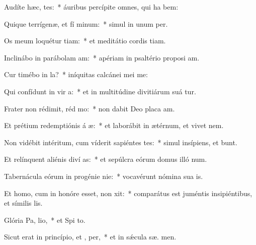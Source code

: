 \item Audíte hæc,  tes:~* áuribus percípite omnes, qui ha bem:
\item Quique terrígenæ, et fí minum:~* simul in unum   per.
\item Os meum loquétur tiam:~* et meditátio cordis  tiam.
\item Inclinábo in parábolam  am:~* apériam in psaltério proposi am.
\item Cur timébo in  la?~* iníquitas calcánei mei  me:
\item Qui confídunt in vir a:~* et in multitúdine divitiárum suá tur.
\item Frater non rédimit, réd mo:~* non dabit Deo placa am.
\item Et prétium redemptiónis á æ:~* et laborábit in ætérnum, et vivet   nem.
\item Non vidébit intéritum, cum víderit sapiéntes tes:~* simul insípiens, et  bunt.
\item Et relínquent aliénis diví as:~* et sepúlcra eórum domus illó  num.
\item Tabernácula eórum in progénie  nie:~* vocavérunt nómina sua   is.
\item Et homo, cum in honóre esset, non xit:~* comparátus est juméntis insipiéntibus, et símilis   lis.
\item Glória Pa,  lio,~* et Spi to.
\item Sicut erat in princípio, et ,  per,~* et in sǽcula sæ. men.
